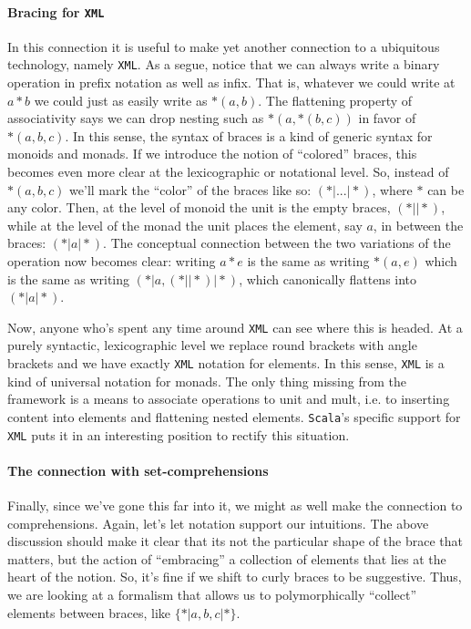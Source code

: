 \paragraph{Bracing for \texttt{XML}}
In this connection it is useful to make yet another connection to a
ubiquitous technology, namely \texttt{XML}. As a segue, notice that we
can always write a binary operation in prefix notation as well as
infix. That is, whatever we could write at $a*b$ we could just as
easily write as $*(a,b)$. The flattening property of associativity
says we can drop nesting such as $*(a,*(b,c))$ in favor of
$*(a,b,c)$. In this sense, the syntax of braces is a kind of generic
syntax for monoids and monads. If we introduce the notion of
``colored'' braces, this becomes even more clear at the lexicographic
or notational level. So, instead of $*(a,b,c)$ we'll mark the
``color'' of the braces like so: $(*| ... |*)$, where $*$ can be any
color. Then, at the level of monoid the unit is the empty braces, $(*|
|*)$, while at the level of the monad the unit places the element, say
$a$, in between the braces: $(*| a |*)$. The conceptual connection
between the two variations of the operation now becomes clear: writing
$a*e$ is the same as writing $*(a,e)$ which is the same as writing
$(*| a , (*| |*) |*)$, which canonically flattens into $(*| a |*)$.

Now, anyone who's spent any time around \texttt{XML} can see where
this is headed. At a purely syntactic, lexicographic level we replace
round brackets with angle brackets and we have exactly \texttt{XML}
notation for elements. In this sense, \texttt{XML} is a kind of
universal notation for monads. The only thing missing from the
framework is a means to associate operations to unit and mult, i.e. to
inserting content into elements and flattening nested
elements. \texttt{Scala}'s specific support for \texttt{XML} puts it
in an interesting position to rectify this situation.

\paragraph{The connection with set-comprehensions}
Finally, since we've gone this far into it, we might as well make the
connection to comprehensions. Again, let's let notation support our
intuitions. The above discussion should make it clear that its not the
particular shape of the brace that matters, but the action of
``embracing'' a collection of elements that lies at the heart of the
notion. So, it's fine if we shift to curly braces to be
suggestive. Thus, we are looking at a formalism that allows us to
polymorphically ``collect'' elements between braces, like $\{*| a, b, c |*\}$.

